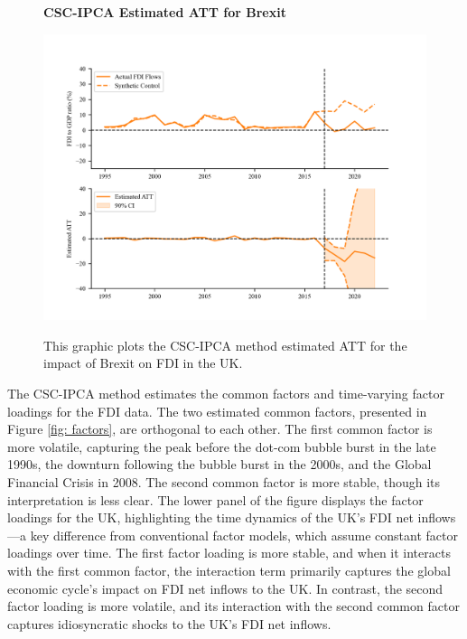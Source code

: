 \documentclass[12pt]{article}
\begin{document}
\begin{figure}[!ht]
    \centering
    \caption{\textbf{CSC-IPCA Estimated ATT for Brexit}}
    \includegraphics{figs/ukfdi_ipca.png}
    \label{fig: ipca_est}
    \caption*{\footnotesize{This graphic plots the CSC-IPCA method estimated ATT for the impact of Brexit on FDI in the UK.}}
    \end{figure}

The CSC-IPCA method estimates the common factors and time-varying factor loadings for the FDI data. The two estimated common factors, presented in Figure \ref{fig: factors}, are orthogonal to each other. The first common factor is more volatile, capturing the peak before the dot-com bubble burst in the late 1990s, the downturn following the bubble burst in the 2000s, and the Global Financial Crisis in 2008. The second common factor is more stable, though its interpretation is less clear. The lower panel of the figure displays the factor loadings for the UK, highlighting the time dynamics of the UK's FDI net inflows—a key difference from conventional factor models, which assume constant factor loadings over time. The first factor loading is more stable, and when it interacts with the first common factor, the interaction term primarily captures the global economic cycle's impact on FDI net inflows to the UK. In contrast, the second factor loading is more volatile, and its interaction with the second common factor captures idiosyncratic shocks to the UK's FDI net inflows.
\end{document}
